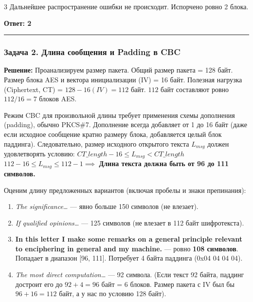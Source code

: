 ﻿\documentclass[9pt,a4paper,landscape]{extarticle}
\newcommand{\tightlist}{}
\begin{document}
\begin{multicols*}{3}
Дальнейшее распространение ошибки не происходит. Испорчено ровно 2 блока.

\textbf{Ответ: 2}

\begin{center}\rule{0.5\linewidth}{0.5pt}\end{center}

\subsubsection{Задача 2. Длина сообщения и Padding в CBC}\label{ux437ux430ux434ux430ux447ux430-2.-ux434ux43bux438ux43dux430-ux441ux43eux43eux431ux449ux435ux43dux438ux44f-ux438-padding-ux432-cbc}

\textbf{Решение:} Проанализируем размер пакета. Общий размер пакета = 128 байт. Размер блока AES и вектора инициализации (IV) = 16 байт. Полезная нагрузка (Ciphertext, CT) = \(128 - 16 (IV) = 112\) байт. \(112\) байт составляют ровно \(112 / 16 = 7\) блоков AES.

Режим CBC для произвольной длины требует применения схемы дополнения (padding), обычно PKCS\#7. Дополнение всегда добавляет от 1 до 16 байт (даже если исходное сообщение кратно размеру блока, добавляется целый блок паддинга). Следовательно, размер исходного открытого текста \(L_{msg}\) должен удовлетворять условию: \(CT\_length - 16 \le L_{msg} < CT\_length\) \(112 - 16 \le L_{msg} \le 112 - 1 \implies\) \textbf{Длина текста должна быть от 96 до 111 символов.}

Оценим длину предложенных вариантов (включая пробелы и знаки препинания):

\begin{enumerate}
\def\labelenumi{\arabic{enumi}.}
\tightlist
\item
  \emph{The significance\ldots{}} --- явно больше 150 символов (не влезает).
\item
  \emph{If qualified opinions\ldots{}} --- 125 символов (не влезает в 112 байт шифротекста).
\item
  \textbf{In this letter I make some remarks on a general principle relevant to enciphering in general and my machine.} --- ровно \textbf{108 символов}. Попадает в диапазон {[}96, 111{]}. Потребует 4 байта паддинга (0x04 04 04 04).
\item
  \emph{The most direct computation\ldots{}} --- 92 символа. (Если текст 92 байта, паддинг достроит его до \(92+4 = 96\) байт = 6 блоков. Размер пакета с IV был бы \(96+16 = 112\) байт, а у нас по условию 128 байт).
\end{enumerate}


\end{multicols*}
\end{document}
